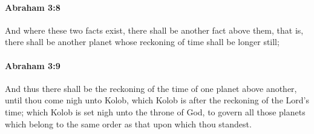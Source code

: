 		\paragraph{Abraham 3:8} %
			\label{ABRAHAM-3-8}

			And where these two facts exist, there shall be another fact above them, that is, there shall be another planet whose reckoning of time shall be longer still;


		\paragraph{Abraham 3:9} %
			\label{ABRAHAM-3-9}

			And thus there shall be the reckoning of the time of one planet above another, until thou come nigh unto Kolob, which Kolob is after the reckoning of the Lord's time; which Kolob is set nigh unto the throne of God, to govern all those planets which belong to the same order as that upon which thou standest.


